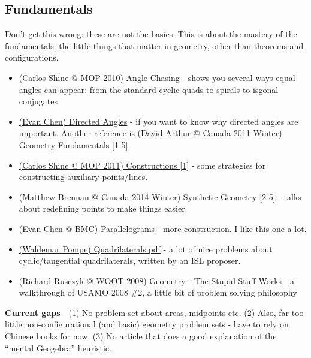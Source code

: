 	\subsection{Fundamentals}
	Don't get this wrong: these are not the basics. This is about the mastery of the fundamentals: the little things that matter in geometry, other than theorems and configurations.
	\begin{itemize}
	\item \href{run:./F_Geometry/(Carlos Shine @ MOP 2010) Angle Chasing.pdf}{(Carlos Shine @ MOP 2010) Angle Chasing} - shows you several ways  equal angles can appear: from the standard cyclic quads to spirals to isgonal conjugates
	\item \href{run:./F_Geometry/(Evan Chen) Directed Angles.pdf}{(Evan Chen) Directed Angles} - if you want to know why directed angles are important. Another reference is \href{run:./F_Geometry/(David Arthur @ Canada 2011 Winter) Geometry Fundamentals.pdf}{(David Arthur @ Canada 2011 Winter) Geometry Fundamentals [1-5]}.
	\item \href{run:./F_Geometry/(Carlos Shine @ MOP 2011) Constructions.pdf}{(Carlos Shine @ MOP 2011) Constructions [1]} - some strategies for constructing auxiliary points/lines. %
	\item \href{run:./F_Geometry/(Matthew Brennan @ Canada 2014 Winter) Synthetic Geometry.pdf}{(Matthew Brennan @ Canada 2014 Winter) Synthetic Geometry [2-5]} - talks about redefining points to make things easier.
	\item \href{run:./F_Geometry/(Evan Chen @ BMC) Parallelograms.pdf}{(Evan Chen @ BMC) Parallelograms} - more construction. I like this one a lot.
	\item \href{run:./F_Geometry/(Waldemar Pompe) Quadrilaterals.pdf}{(Waldemar Pompe) Quadrilaterals.pdf} - a lot of nice problems about cyclic/tangential quadrilaterals, written by an ISL proposer.
	\item \href{run:./F_Geometry/(Richard Rusczyk @ WOOT 2008) Geometry - The Stupid Stuff Works.pdf}{(Richard Rusczyk @ WOOT 2008) Geometry - The Stupid Stuff Works} - a walkthrough of USAMO 2008 \#2, a little bit of problem solving philosophy
	\end{itemize}
	\textbf{Current gaps} -  (1) No problem set about areas, midpoints etc. (2) Also, far too little non-configurational (and basic) geometry problem sets - have to rely on Chinese books for now. (3) No article that does a good explanation of the ``mental Geogebra'' heuristic.
%

